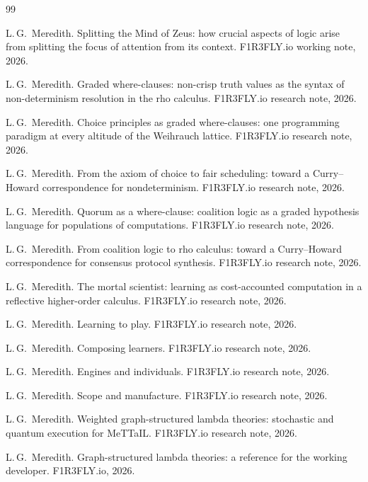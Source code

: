 \documentclass[11pt]{article}
\theoremstyle{definition}
\theoremstyle{plain}
\newcommand{\rhoc}{\textsf{rho}}
\begin{document}
\newpage
{\raggedright
\begin{thebibliography}{99}

 L.\,G.\ Meredith. Splitting the Mind of Zeus: how crucial aspects
of logic arise from splitting the focus of attention from its context.
F1R3FLY.io working note, 2026.

 L.\,G.\ Meredith. Graded where-clauses: non-crisp truth
values as the syntax of non-determinism resolution in the \rhoc{} calculus.
F1R3FLY.io research note, 2026.

 L.\,G.\ Meredith. Choice principles as graded
where-clauses: one programming paradigm at every altitude of the Weihrauch
lattice. F1R3FLY.io research note, 2026.

 L.\,G.\ Meredith. From the axiom of choice to fair
scheduling: toward a Curry--Howard correspondence for nondeterminism.
F1R3FLY.io research note, 2026.

 L.\,G.\ Meredith. Quorum as a where-clause: coalition logic
as a graded hypothesis language for populations of computations. F1R3FLY.io
research note, 2026.

 L.\,G.\ Meredith. From coalition logic to \rhoc{}
calculus: toward a Curry--Howard correspondence for consensus protocol
synthesis. F1R3FLY.io research note, 2026.

 L.\,G.\ Meredith. The mortal scientist: learning as
cost-accounted computation in a reflective higher-order calculus. F1R3FLY.io
research note, 2026.

 L.\,G.\ Meredith. Learning to play. F1R3FLY.io research note,
2026.

 L.\,G.\ Meredith. Composing learners. F1R3FLY.io research
note, 2026.

 L.\,G.\ Meredith. Engines and individuals. F1R3FLY.io
research note, 2026.

 L.\,G.\ Meredith. Scope and manufacture. F1R3FLY.io research
note, 2026.

 L.\,G.\ Meredith. Weighted graph-structured lambda
theories: stochastic and quantum execution for MeTTaIL. F1R3FLY.io research
note, 2026.

 L.\,G.\ Meredith. Graph-structured lambda theories: a
reference for the working developer. F1R3FLY.io, 2026.


\end{thebibliography}}
\end{document}
